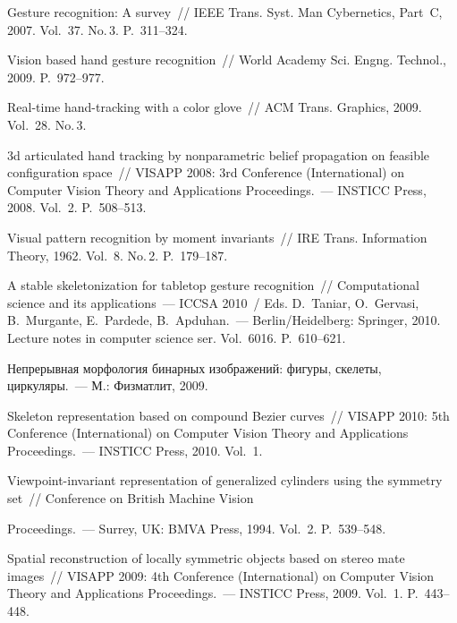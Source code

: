 \begin{multicols}{2}
{{\begin{thebibliography}{99}
 Gesture recognition: A survey~//
  IEEE Trans. Syst. Man Cybernetics, Part~C, 2007. Vol.~37. No.\,3.
P.~311--324.

 Vision based hand gesture
  recognition~// World Academy Sci. Engng. Technol., 2009.
P.~972--977.

 Real-time hand-tracking with
  a color glove~// ACM Trans. Graphics, 2009. Vol.~28. No.\,3.

 3d articulated hand tracking by
  nonparametric belief propagation on feasible configuration space~// VISAPP
  2008:  3rd  Conference (International) on Computer Vision
  Theory and Applications Proceedings.~---  INSTICC Press, 2008.  Vol.~2.
P.~508--513.

 Visual pattern recognition by moment
  invariants~// IRE Trans. Information Theory, 1962. Vol.~8. No.\,2.
P.~179--187.

 A stable skeletonization for
  tabletop gesture recognition~// Computational science and its
  applications~--- ICCSA 2010~/ Eds. D.~Taniar, O.~Gervasi, B.~Murgante,
  E.~Pardede, B.~Apduhan.~---
 Berlin/Heidelberg: Springer, 2010.   Lecture notes in computer science ser. Vol.~6016.
P.~610--621.

 Непрерывная морфология бинарных
  изображений: фигуры, скелеты, циркуляры.~--- М.: Физматлит, 2009.

 Skeleton representation based on compound
  Bezier curves~// VISAPP 2010:  5th Conference (International)
  on Computer Vision Theory and Applications Proceedings.~---
 INSTICC Press, 2010.  Vol.~1. 
 
 Viewpoint-invariant
  representation of generalized cylinders using the symmetry set~//
  Conference on British Machine Vision\linebreak\vspace*{-12pt}
  \pagebreak
  
  \noindent
  Proceedings.~---
Surrey, UK: BMVA Press, 1994.  Vol.~2.  P.~539--548.

 Spatial reconstruction of
  locally symmetric objects based on stereo mate images~// VISAPP 2009:
  4th Conference (International)  on Computer Vision Theory
  and Applications Proceedings.~---  INSTICC Press, 2009.  Vol.~1.  P.~443--448.


\end{thebibliography}}}
\end{multicols}
